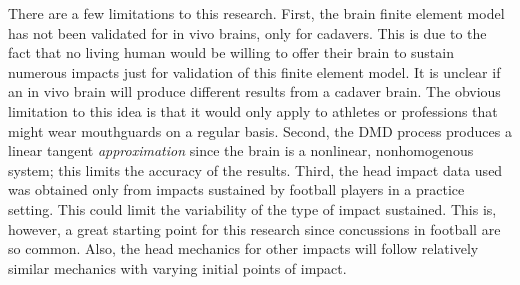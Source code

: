 \documentclass[%
 aip,
 amsmath,amssymb,
 reprint,%
 floatfix,%
]{revtex4-1}
\begin{document}
There are a few limitations to this research. First, the brain finite element model has not been validated for in vivo brains, only for cadavers. This is due to the fact that no living human would be willing to offer their brain to sustain numerous impacts just for validation of this finite element model. It is unclear if an in vivo brain will produce different results from a cadaver brain. The obvious limitation to this idea is that it would only apply to athletes or professions that might wear mouthguards on a regular basis. Second, the DMD process produces a linear tangent {\it approximation} since the brain is a nonlinear, nonhomogenous system; this limits the accuracy of the results. Third, the head impact data used was obtained only from impacts sustained by football players in a practice setting. This could limit the variability of the type of impact sustained. This is, however, a great starting point for this research since concussions in football are so common. Also, the head mechanics for other impacts will follow relatively similar mechanics with varying initial points of impact.

\end{document}
